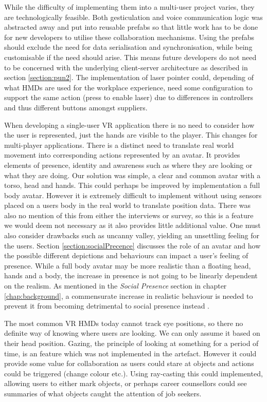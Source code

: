 While the difficulty of implementing them into a multi-user project varies, they are technologically feasible. Both gesticulation and voice communication logic was abstracted away and put into reusable prefabs so that little work has to be done for new developers to utilise these collaboration mechanisms. Using the prefabs should exclude the need for data serialisation and synchronisation, while being customisable if the need should arise. This means future developers do not need to be concerned with the underlying client-server architecture as described in section \ref{section:pun2}.
The implementation of laser pointer could, depending of what HMDs are used for the workplace experience, need some configuration to support the same action (press to enable laser) due to differences in controllers and thus different buttons amongst suppliers.  

When developing a single-user VR application there is no need to consider how the user is represented, just the hands are visible to the player. This changes for multi-player applications. There is a distinct need to translate real world movement into corresponding actions represented by an avatar. It provides elements of presence, identity and awareness such as where they are looking or what they are doing. Our solution was simple, a clear and common avatar with a torso, head and hands. This could perhaps be improved by implementation a full body avatar. However it is extremely difficult to implement without using sensors placed on a users body in the real world to translate position data. There was also no mention of this from either the interviews or survey, so this is a feature we would deem not necessary as it also provides little additional value. One must also consider drawbacks such as uncanny valley, yielding an unsettling feeling for the users. Section \ref{section:socialPrecence} discusses the role of an avatar and how the possible different depictions and behaviours can impact a user's feeling of presence. While a full body avatar may be more realistic than a floating head, hands and a body, the increase in presence is not going to be linearly dependent on the realism. As mentioned in the \textit{Social Presence} section in chapter \ref{chap:background}, a commensurate increase in realistic behaviour is needed to prevent it from becoming detrimental to social presence instead \cite{oh2018systematic}. 

The most common VR HMDs today cannot track eye positions, so there no definite way of knowing where users are looking. We can only assume it based on their head position. Gazing, the principle of looking at something for a period of time, is an feature which was not implemented in the artefact. However it could provide some value for collaboration as users could stare at objects and actions could be triggered (change colour etc.). Using ray-casting this could implemented, allowing users to either mark objects, or perhaps career counsellors could see summaries of what objects caught the attention of job seekers. 

